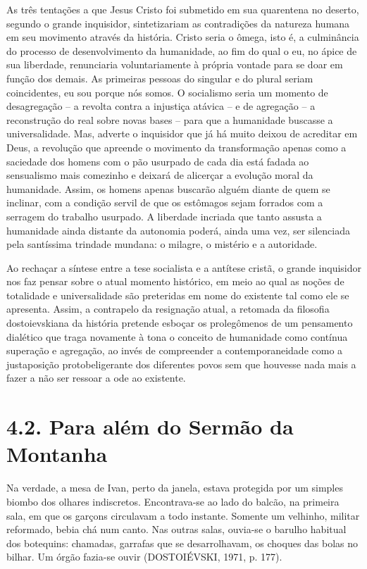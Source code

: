 As três tentações a que Jesus Cristo foi submetido em sua quarentena no
deserto, segundo o grande inquisidor, sintetizariam as contradições da
natureza humana em seu movimento através da história. Cristo seria o
ômega, isto é, a culminância do processo de desenvolvimento da
humanidade, ao fim do qual o eu, no ápice de sua liberdade, renunciaria
voluntariamente à própria vontade para se doar em função dos demais. As
primeiras pessoas do singular e do plural seriam coincidentes, eu sou
porque nós somos. O socialismo seria um momento de desagregação -- a
revolta contra a injustiça atávica -- e de agregação -- a reconstrução
do real sobre novas bases -- para que a humanidade buscasse a
universalidade. Mas, adverte o inquisidor que já há muito deixou de
acreditar em Deus, a revolução que apreende o movimento da transformação
apenas como a saciedade dos homens com o pão usurpado de cada dia está
fadada ao sensualismo mais comezinho e deixará de alicerçar a evolução
moral da humanidade. Assim, os homens apenas buscarão alguém diante de
quem se inclinar, com a condição servil de que os estômagos sejam
forrados com a serragem do trabalho usurpado. A liberdade incriada que
tanto assusta a humanidade ainda distante da autonomia poderá, ainda uma
vez, ser silenciada pela santíssima trindade mundana: o milagre, o
mistério e a autoridade.

Ao rechaçar a síntese entre a tese socialista e a antítese cristã, o
grande inquisidor nos faz pensar sobre o atual momento histórico, em
meio ao qual as noções de totalidade e universalidade são preteridas em
nome do existente tal como ele se apresenta. Assim, a contrapelo da
resignação atual, a retomada da filosofia dostoievskiana da história
pretende esboçar os prolegômenos de um pensamento dialético que traga
novamente à tona o conceito de humanidade como contínua superação e
agregação, ao invés de compreender a contemporaneidade como a
justaposição protobeligerante dos diferentes povos sem que houvesse nada
mais a fazer a não ser ressoar a ode ao existente.

\section{4.2. Para além do Sermão da Montanha}

Na verdade, a mesa de Ivan, perto da janela, estava protegida por um
simples biombo dos olhares indiscretos. Encontrava-se ao lado do balcão,
na primeira sala, em que os garçons circulavam a todo instante. Somente
um velhinho, militar reformado, bebia chá num canto. Nas outras salas,
ouvia-se o barulho habitual dos botequins: chamadas, garrafas que se
desarrolhavam, os choques das bolas no bilhar. Um órgão fazia-se ouvir
(DOSTOIÉVSKI, 1971, p. 177).

